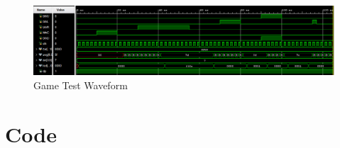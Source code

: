 \documentclass[11pt]{article}
\newcommand{\Verilog}[2][]{%
	
}
\begin{document}
\begin{figure}[ht]\centering
	\includegraphics[width=1.0\textwidth,trim=0 0mm 0 0,clip]{GameTest}
	\caption{Game Test Waveform}
\end{figure}

\clearpage

\section*{Code}

\Verilog[firstline=23,caption=Verilog Guessing Game Source,label=code:file_ex]
{guessing_game.sv}

\Verilog[firstline=23,caption=Verilog Guessing Game Test Bench,label=code:file_ex]
{Game_Test.sv}

\Verilog[firstline=23,caption=Verilog Finite State Machine Source,label=code:file_ex]
{guess_FSM.sv}

\Verilog[firstline=23,caption=Verilog Finite State Machine Test Bench,label=code:file_ex]
{guess_Test.sv}
\end{document}
